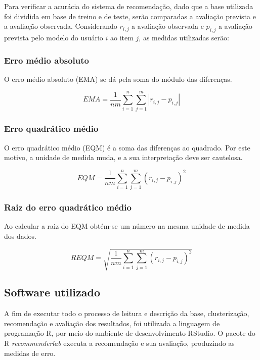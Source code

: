 \documentclass[12pt,a4paper,header]{abnt}
\begin{document}
Para verificar a acurácia do sistema de recomendação, dado que a base utilizada foi dividida em base de treino e de teste, serão comparadas a avaliação prevista e a avaliação observada. Considerando $r_{i,j}$ a avaliação observada e $p_{i,j}$ a avaliação prevista pelo modelo do usuário $i$ ao item $j$, as medidas utilizadas serão\cite{gorakala2015building}:

\subsubsection{Erro médio absoluto}

O erro médio absoluto (EMA) se dá pela soma do módulo das diferenças. 

\begin{equation}
EMA = \frac{1}{nm} \sum_{i=1}^{n} \sum_{j=1}^m \left| r_{i,j} - p_{i,j}  \right|
\end{equation}

\subsubsection{Erro quadrático médio}

O erro quadrático médio (EQM) é a soma das diferenças ao quadrado. Por este motivo, a unidade de medida muda, e a sua interpretação deve ser cautelosa.

\begin{equation}
EQM = \frac{1}{nm} \sum_{i=1}^{n} \sum_{j=1}^m \left( r_{i,j} - p_{i,j}  \right)^2
\end{equation}

\subsubsection{Raiz do erro quadrático médio}

Ao calcular a raiz do EQM obtém-se um número na mesma unidade de medida dos dados.

\begin{equation}
REQM = \sqrt{\frac{1}{nm} \sum_{i=1}^{n} \sum_{j=1}^m \left( r_{i,j} - p_{i,j}  \right)^2}
\end{equation}

\subsection{Software utilizado}

A fim de executar todo o processo de leitura e descrição da base, clusterização, recomendação e avaliação dos resultados, foi utilizada a linguagem de programação R\cite{R}, por meio do ambiente de desenvolvimento RStudio\cite{RStudio}. O pacote do R \textit{recommenderlab}\cite{recommenderlab} executa a recomendação e sua avaliação, produzindo as medidas de erro.
\end{document}
